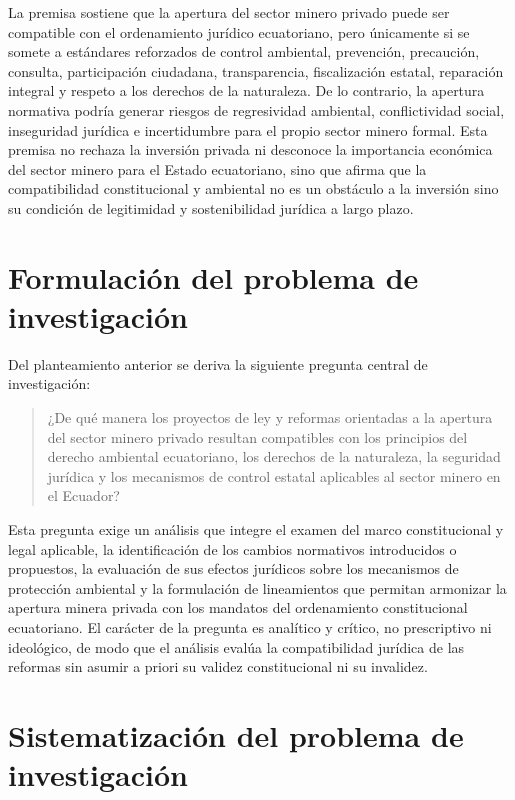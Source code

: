 La premisa sostiene que la apertura del sector minero privado puede ser compatible con el ordenamiento jurídico ecuatoriano, pero únicamente si se somete a estándares reforzados de control ambiental, prevención, precaución, consulta, participación ciudadana, transparencia, fiscalización estatal, reparación integral y respeto a los derechos de la naturaleza. De lo contrario, la apertura normativa podría generar riesgos de regresividad ambiental, conflictividad social, inseguridad jurídica e incertidumbre para el propio sector minero formal. Esta premisa no rechaza la inversión privada ni desconoce la importancia económica del sector minero para el Estado ecuatoriano, sino que afirma que la compatibilidad constitucional y ambiental no es un obstáculo a la inversión sino su condición de legitimidad y sostenibilidad jurídica a largo plazo.

\section{Formulación del problema de investigación}

Del planteamiento anterior se deriva la siguiente pregunta central de investigación:

\begin{quote}
¿De qué manera los proyectos de ley y reformas orientadas a la apertura del sector minero privado resultan compatibles con los principios del derecho ambiental ecuatoriano, los derechos de la naturaleza, la seguridad jurídica y los mecanismos de control estatal aplicables al sector minero en el Ecuador?
\end{quote}

Esta pregunta exige un análisis que integre el examen del marco constitucional y legal aplicable, la identificación de los cambios normativos introducidos o propuestos, la evaluación de sus efectos jurídicos sobre los mecanismos de protección ambiental y la formulación de lineamientos que permitan armonizar la apertura minera privada con los mandatos del ordenamiento constitucional ecuatoriano. El carácter de la pregunta es analítico y crítico, no prescriptivo ni ideológico, de modo que el análisis evalúa la compatibilidad jurídica de las reformas sin asumir a priori su validez constitucional ni su invalidez.

\section{Sistematización del problema de investigación}

